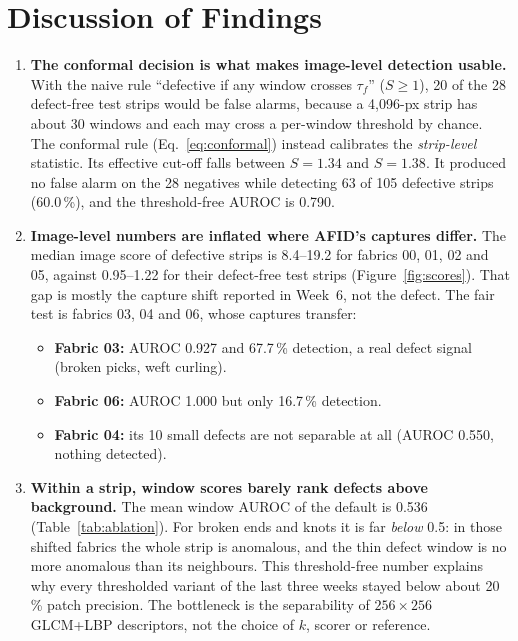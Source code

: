 \documentclass[11pt,a4paper]{article}
\begin{document}
\FloatBarrier
\section*{Discussion of Findings}
\begin{enumerate}
  \item \textbf{The conformal decision is what makes image-level detection usable.} With the naive rule ``defective if any window crosses $\tau_f$'' ($S\ge1$), 20 of the 28 defect-free test strips would be false alarms, because a 4{,}096-px strip has about 30 windows and each may cross a per-window threshold by chance. The conformal rule (Eq.~\ref{eq:conformal}) instead calibrates the \emph{strip-level} statistic. Its effective cut-off falls between $S=1.34$ and $S=1.38$. It produced no false alarm on the 28 negatives while detecting 63 of 105 defective strips (60.0\,\%), and the threshold-free AUROC is 0.790.
  \item \textbf{Image-level numbers are inflated where AFID's captures differ.} The median image score of defective strips is 8.4--19.2 for fabrics 00, 01, 02 and 05, against 0.95--1.22 for their defect-free test strips (Figure~\ref{fig:scores}). That gap is mostly the capture shift reported in Week~6, not the defect. The fair test is fabrics 03, 04 and 06, whose captures transfer:
  \begin{itemize}
    \item \textbf{Fabric 03:} AUROC 0.927 and 67.7\,\% detection, a real defect signal (broken picks, weft curling).
    \item \textbf{Fabric 06:} AUROC 1.000 but only 16.7\,\% detection.
    \item \textbf{Fabric 04:} its 10 small defects are not separable at all (AUROC 0.550, nothing detected).
  \end{itemize}
  \item \textbf{Within a strip, window scores barely rank defects above background.} The mean window AUROC of the default is 0.536 (Table~\ref{tab:ablation}). For broken ends and knots it is far \emph{below} 0.5: in those shifted fabrics the whole strip is anomalous, and the thin defect window is no more anomalous than its neighbours. This threshold-free number explains why every thresholded variant of the last three weeks stayed below about 20\,\% patch precision. The bottleneck is the separability of $256\times256$ GLCM+LBP descriptors, not the choice of $k$, scorer or reference.

\end{enumerate}
\end{document}
